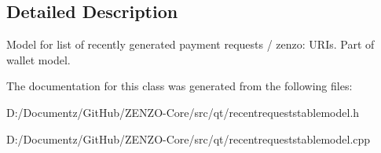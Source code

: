 \subsection{Detailed Description}
Model for list of recently generated payment requests / zenzo\+: U\+R\+Is. Part of wallet model. 

The documentation for this class was generated from the following files\+:\begin{DoxyCompactItemize}
\item 
D\+:/\+Documentz/\+Git\+Hub/\+Z\+E\+N\+Z\+O-\/\+Core/src/qt/recentrequeststablemodel.\+h\item 
D\+:/\+Documentz/\+Git\+Hub/\+Z\+E\+N\+Z\+O-\/\+Core/src/qt/recentrequeststablemodel.\+cpp\end{DoxyCompactItemize}
